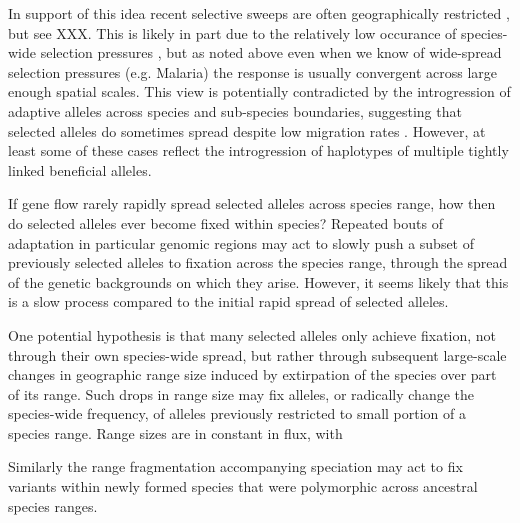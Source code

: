 \documentclass{article}
\newcommand{\gc}[1]{{\it\color{green}(#1)} }
\begin{document}
In support of this idea recent selective sweeps are often
geographically restricted \citep{}, but see XXX. This is likely in part due to the
relatively low occurance of species-wide selection pressures \citep{},
but as noted above even when we know of wide-spread selection
pressures (e.g. Malaria) the response is usually convergent across large enough
spatial scales. This view is potentially contradicted by the
introgression of adaptive alleles across species and sub-species
boundaries, suggesting that selected alleles do sometimes spread
despite low migration rates \citep{}. However, at least some of
these cases reflect the introgression of haplotypes of multiple tightly linked beneficial
alleles.  


If gene flow rarely rapidly spread selected alleles across
species range, how then do selected alleles ever become fixed within species? 
Repeated bouts of adaptation in particular genomic regions may act to slowly
push a subset of previously selected alleles to fixation across the
species range, through the spread of the genetic backgrounds on which they arise.  
However, it seems likely that this is a slow process compared to the
initial rapid spread of selected alleles.

One potential hypothesis is that many selected alleles only achieve
fixation, not through their own species-wide spread, but rather
through subsequent large-scale
changes in geographic range size induced by extirpation of the species
over part of its range. Such drops in range size may fix alleles, or radically change the
species-wide frequency, of alleles previously restricted to small portion of a species range. 
Range sizes are in constant in flux, with  

Similarly the range fragmentation accompanying speciation may act to fix variants within newly formed
species that were polymorphic across ancestral species ranges. 
\end{document}
